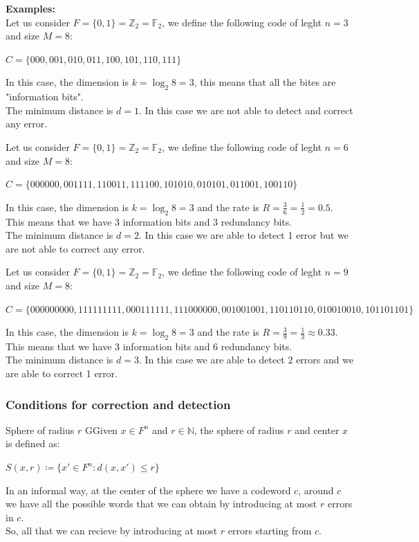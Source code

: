 \noindent
\textbf{Examples:}\\
Let us consider $F = \{0, 1\} = \mathbb{Z}_2 = \mathbb{F}_2$, we define the following code of leght $n = 3$ and size $M = 8$:
\begin{center}
    $C = \{000, 001, 010, 011, 100, 101, 110, 111\}$
\end{center}
\noindent
In this case, the dimension is $k = \log_2 8 = 3$, this means that all the bites are "information bits".\\
The minimum distance is $d = 1$. In this case we are not able to detect and correct any error.
\vspace{1 cm}

\noindent
Let us consider $F = \{0, 1\} = \mathbb{Z}_2 = \mathbb{F}_2$, we define the following code of leght $n = 6$ and size $M = 8$:
\begin{center}
    $C = \{000000, 001111, 110011, 111100, 101010, 010101, 011001, 100110\}$
\end{center}
\noindent
In this case, the dimension is $k = \log_2 8 = 3$ and the rate is $R = \frac{3}{6} = \frac{1}{2} = 0.5 $. This means that we have 3 information bits and 3 redundancy bits.\\
The minimum distance is $d = 2$. In this case we are able to detect 1 error but we are not able to correct any error.
\vspace{1 cm}

\noindent
Let us consider $F = \{0, 1\} = \mathbb{Z}_2 = \mathbb{F}_2$, we define the following code of leght $n = 9$ and size $M = 8$:
\begin{center}
    $C = \{000000000, 111111111, 000111111, 111000000, 001001001, 110110110, 010010010, 101101101\}$
\end{center}
\noindent
In this case, the dimension is $k = \log_2 8 = 3$ and the rate is $R = \frac{3}{9} = \frac{1}{3} \approx 0.33 $. This means that we have 3 information bits and 6 redundancy bits.\\
The minimum distance is $d = 3$. In this case we are able to detect 2 errors and we are able to correct 1 error.

\subsubsection{Conditions for correction and detection}
\begin{defBox}{Sphere of radius $r$}
    GGiven $x \in F^n$ and $r \in \mathbb{N}$, the sphere of radius $r$ and center $x$ is defined as:
    \begin{center}
        $S(x, r) \coloneqq \{x' \in F^n : d(x, x') \leq r\}$
    \end{center}  
\end{defBox}
\noindent
In an informal way, at the center of the sphere we have a codeword $c$, around $c$ we have all the possible words that we can obtain by introducing at most $r$ errors in $c$.\\
So, all that we can recieve by introducing at most $r$ errors starting from $c$.
\vspace{1 cm}

